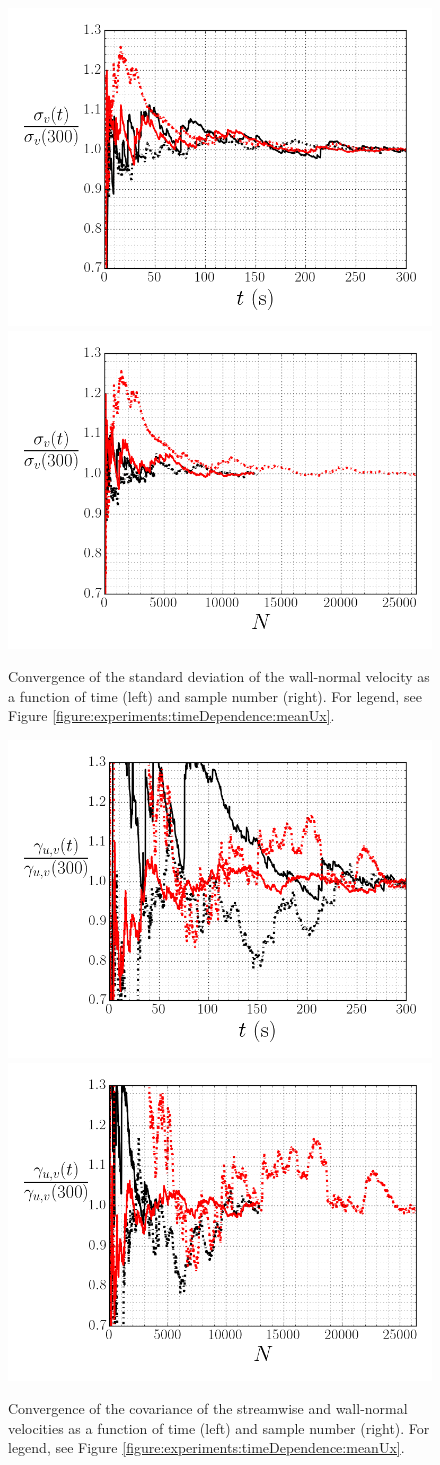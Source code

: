 \documentclass[12pt,oneside,a4paper]{article}
\begin{document}
\begin{figure}
\centering
\includegraphics[width=0.5\linewidth]{images/LDA_timeDependenceImages/uyRMSTConvergence.png}\hfill
\includegraphics[width=0.5\linewidth]{images/LDA_timeDependenceImages/uyRMSNConvergence.png}\\
\caption{Convergence of the standard deviation of the wall-normal velocity as a function of time (left) and sample number (right). For legend, see Figure \ref{figure:experiments:timeDependence:meanUx}.}
\label{figure:experiments:timeDependence:RMSuy}
\end{figure}

\begin{figure}
\centering
\includegraphics[width=0.5\linewidth]{images/LDA_timeDependenceImages/uvTConvergence.png}\hfill
\includegraphics[width=0.5\linewidth]{images/LDA_timeDependenceImages/uvNConvergence.png}\\
\caption{Convergence of the covariance of the streamwise and wall-normal velocities as a function of time (left) and sample number (right). For legend, see Figure \ref{figure:experiments:timeDependence:meanUx}.}
\label{figure:experiments:timeDependence:uv}
\end{figure}
\newpage
\end{document}
